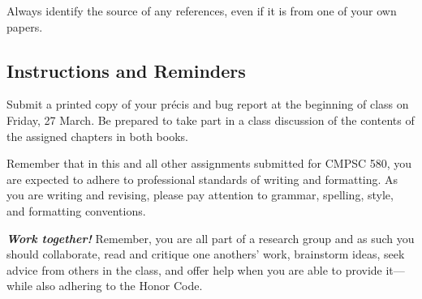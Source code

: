 Always identify the source of any references, even if it is from one of your own papers.

\subsection*{Instructions and Reminders}

Submit a printed copy of your pr\'{e}cis and bug report at the beginning of class on Friday, 27 March. Be prepared to
take part in a class discussion of the contents of the assigned chapters in both books.

Remember that in this and all other assignments submitted for CMPSC 580, you are expected to adhere to professional
standards of writing and formatting. As you are writing and revising, please pay attention to grammar, spelling, style,
and formatting conventions.

{\large\color{black}\textbf{\textit{Work together!}}} Remember, you are all part of a research group and as such you
should collaborate, read and critique one anothers' work, brainstorm ideas, seek advice from others in the class, and offer
help when you are able to provide it---while also adhering to the Honor Code.


